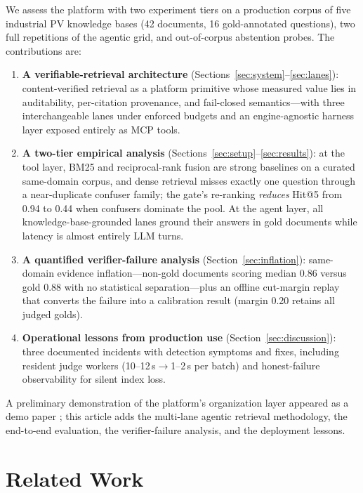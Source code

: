 \documentclass[journal]{IEEEtran}
\begin{document}
We assess the platform with two experiment tiers on a production corpus
of five industrial PV knowledge bases (42 documents, 16 gold-annotated
questions), two full repetitions of the agentic grid, and out-of-corpus
abstention probes. The contributions are:
\begin{enumerate}
\item \textbf{A verifiable-retrieval architecture}
(Sections~\ref{sec:system}--\ref{sec:lanes}): content-verified retrieval
as a platform primitive whose measured value lies in auditability,
per-citation provenance, and fail-closed semantics---with three
interchangeable lanes under enforced budgets and an engine-agnostic
harness layer exposed entirely as MCP tools.
\item \textbf{A two-tier empirical analysis}
(Sections~\ref{sec:setup}--\ref{sec:results}): at the tool layer, BM25
and reciprocal-rank fusion are strong baselines on a curated same-domain
corpus, and dense retrieval misses exactly one question through a
near-duplicate confuser family; the gate's re-ranking \emph{reduces}
Hit@5 from 0.94 to 0.44 when confusers dominate the pool. At the agent
layer, all knowledge-base-grounded lanes ground their answers in gold
documents while latency is almost entirely LLM turns.
\item \textbf{A quantified verifier-failure analysis}
(Section~\ref{sec:inflation}): same-domain evidence inflation---non-gold
documents scoring median 0.86 versus gold 0.88 with no statistical
separation---plus an offline cut-margin replay that converts the failure
into a calibration result (margin 0.20 retains all judged golds).
\item \textbf{Operational lessons from production use}
(Section~\ref{sec:discussion}): three documented incidents with
detection symptoms and fixes, including resident judge workers
(10--12\,s$\to$1--2\,s per batch) and honest-failure observability for
silent index loss.
\end{enumerate}

A preliminary demonstration of the platform's organization layer appeared
as a demo paper \cite{qdcvr-demo}; this article adds the multi-lane
agentic retrieval methodology, the end-to-end evaluation, the
verifier-failure analysis, and the deployment lessons.

\section{Related Work}
\label{sec:related}
\end{document}

